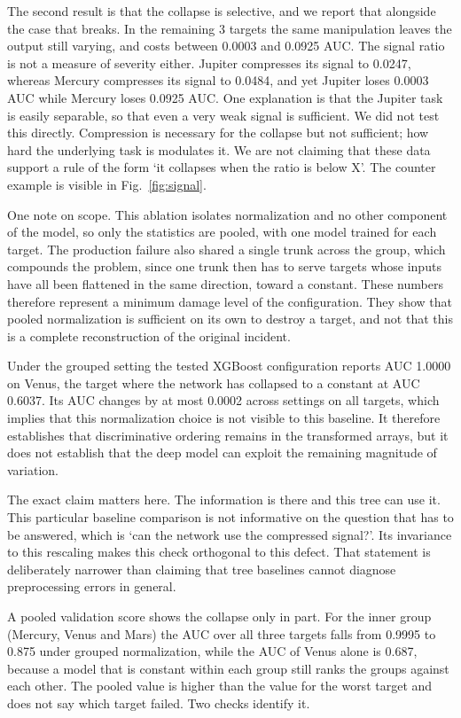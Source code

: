 \documentclass{IEEEtaes}
\begin{document}
The second result is that the collapse is selective, and we report that alongside the case that breaks. In the remaining 3 targets the same manipulation leaves the output still varying, and costs between 0.0003 and 0.0925 AUC. The signal ratio is not a measure of severity either. Jupiter compresses its signal to 0.0247, whereas Mercury compresses its signal to 0.0484, and yet Jupiter loses 0.0003 AUC while Mercury loses 0.0925 AUC. One explanation is that the Jupiter task is easily separable, so that even a very weak signal is sufficient. We did not test this directly. Compression is necessary for the collapse but not sufficient; how hard the underlying task is modulates it. We are not claiming that these data support a rule of the form `it collapses when the ratio is below X'. The counter example is visible in Fig.~\ref{fig:signal}.

One note on scope. This ablation isolates normalization and no other component of the model, so only the statistics are pooled, with one model trained for each target. The production failure also shared a single trunk across the group, which compounds the problem, since one trunk then has to serve targets whose inputs have all been flattened in the same direction, toward a constant. These numbers therefore represent a minimum damage level of the configuration. They show that pooled normalization is sufficient on its own to destroy a target, and not that this is a complete reconstruction of the original incident.

Under the grouped setting the tested XGBoost configuration reports AUC 1.0000 on Venus, the target where the network has collapsed to a constant at AUC 0.6037. Its AUC changes by at most 0.0002 across settings on all targets, which implies that this normalization choice is not visible to this baseline. It therefore establishes that discriminative ordering remains in the transformed arrays, but it does not establish that the deep model can exploit the remaining magnitude of variation.

The exact claim matters here. The information is there and this tree can use it. This particular baseline comparison is not informative on the question that has to be answered, which is `can the network use the compressed signal?'. Its invariance to this rescaling makes this check orthogonal to this defect. That statement is deliberately narrower than claiming that tree baselines cannot diagnose preprocessing errors in general.

A pooled validation score shows the collapse only in part. For the inner group (Mercury, Venus and Mars) the AUC over all three targets falls from 0.9995 to 0.875 under grouped normalization, while the AUC of Venus alone is 0.687, because a model that is constant within each group still ranks the groups against each other. The pooled value is higher than the value for the worst target and does not say which target failed. Two checks identify it.
\end{document}
